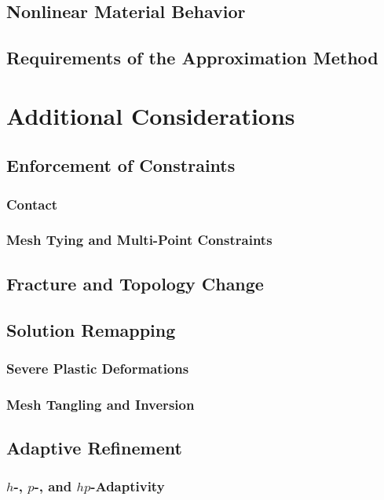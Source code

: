 \subsection{Nonlinear Material Behavior}
\subsection{Requirements of the Approximation Method}

\section{Additional Considerations}

\subsection{Enforcement of Constraints}
\subsubsection{Contact}
\subsubsection{Mesh Tying and Multi-Point Constraints}

\subsection{Fracture and Topology Change}

\subsection{Solution Remapping}
\subsubsection{Severe Plastic Deformations}
\subsubsection{Mesh Tangling and Inversion}

\subsection{Adaptive Refinement}
\subsubsection{$h$-, $p$-, and $hp$-Adaptivity}
